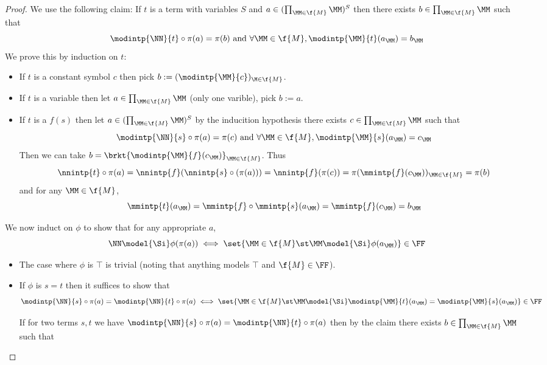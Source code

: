 \begin{proof}
    We use the following claim:
    If $t$ is a term with variables $S$ and 
    $a \in (\prod_{\MM \in \f{M}} \MM)^S$
    then there exists $b \in \prod_{\MM \in \f{M}} \MM$ such that 
    \[\modintp{\NN}{t}\circ \pi(a) = \pi(b) \text{ and } 
    \forall \MM \in \f{M}, \modintp{\MM}{t}(a_\MM) = b_\MM\]
    We prove this by induction on $t$:
    \begin{itemize}
        \item If $t$ is a constant symbol $c$ then pick 
            $b := (\modintp{\MM}{c})_{\M \in \f{M}}$.
        \item If $t$ is a variable then let 
            $a \in \prod_{\MM \in \f{M}} \MM$ (only one varible), 
            pick $b := a$.
        \item If $t$ is a $f(s)$ then let $a \in (\prod_{\MM \in \f{M}} \MM)^S$
            by the inducition hypothesis there exists 
            $c \in \prod_{\MM \in \f{M}} \MM$ such that 
            \[\modintp{\NN}{s} \circ \pi(a) = \pi(c) \text{ and } 
            \forall \MM \in \f{M}, \modintp{\MM}{s}(a_\MM) = c_\MM\]
            Then we can take 
            $b = \brkt{\modintp{\MM}{f}(c_\MM)}_{\MM \in \f{M}}$. 
            Thus 
            \[\nnintp{t}\circ \pi(a) = \nnintp{f}(\nnintp{s}\circ (\pi(a)))
            = \nnintp{f}(\pi(c)) = \pi(\mmintp{f}(c_\MM))_{\MM \in \f{M}}
            = \pi(b)\]
            and for any $\MM \in \f{M}$,
            \[\mmintp{t}(a_\MM) = \mmintp{f} \circ \mmintp{s} (a_\MM)
            = \mmintp{f}(c_\MM) = b_\MM\]
    \end{itemize}
    We now induct on $\phi$ to show that for any appropriate $a$,
    \[\NN \model{\Si} \phi(\pi(a)) \iff 
    \set{\MM \in \f{M} \st \MM \model{\Si} \phi(a_\MM)} \in \FF\]
    \begin{itemize}
        \item The case where $\phi$ is $\top$ is trivial 
            (noting that anything models $\top$ and $\f{M} \in \FF$).
        \item If $\phi$ is $s = t$ then it suffices to show that 
        \[  
            \modintp{\NN}{s}\circ \pi(a) = \modintp{\NN}{t}\circ \pi(a)
            \iff 
            \set{\MM \in \f{M} \st \MM \model{\Si} \modintp{\MM}{t}(a_\MM) = 
            \modintp{\MM}{s}(a_\MM)} \in \FF
        \]
        \begin{forward}
            If for two terms $s,t$ we have
            $\modintp{\NN}{s}\circ \pi(a) = \modintp{\NN}{t}\circ \pi(a)$
            then by the claim
            there exists $b \in \prod_{\MM \in \f{M}} \MM$ such that

\end{forward}
\end{itemize}
\end{proof}
